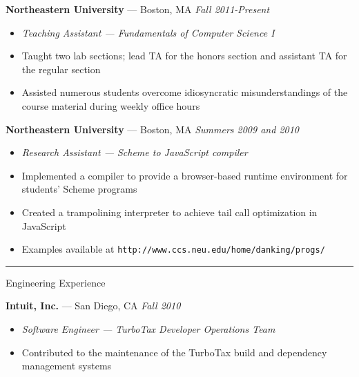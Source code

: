 \documentclass[10pt]{letter}
\begin{document}
\begin{tabbing}
{\large \bf Northeastern University} --- Boston, MA \` \textit{Fall 2011-Present}

\end{tabbing}
\begin{itemize}
\setlength\itemsep{1pt}
\item [] \textit{Teaching Assistant --- Fundamentals of Computer Science I}
\item{Taught two lab sections; lead TA for the honors section and assistant TA
  for the regular section}
\item{Assisted numerous students overcome idiosyncratic misunderstandings of the
  course material during weekly office hours}

\end{itemize}

\begin{tabbing}
{\large \bf Northeastern University} --- Boston, MA \` \textit{Summers 2009 and
  2010}

\end{tabbing}
\begin{itemize}
\setlength\itemsep{1pt}
\item [] \textit{Research Assistant --- Scheme to JavaScript compiler}
\item{Implemented a compiler to provide a browser-based runtime environment for
  students' Scheme programs}
\item{Created a trampolining interpreter to achieve tail call optimization in
  JavaScript}
\item{Examples available at \texttt{http://www.ccs.neu.edu/home/danking/progs/}}

\end{itemize}

\rule{\linewidth}{.5pt}

{\Large Engineering Experience}

\begin{tabbing}
{\large \bf Intuit, Inc.} --- San Diego, CA \` \textit{Fall 2010}

\end{tabbing}

\begin{itemize}
\setlength\itemsep{1pt}
\item [] {\textit{Software Engineer --- TurboTax Developer Operations Team}}
\item{Contributed to the maintenance of the TurboTax build and dependency
  management systems}
\end{itemize}
\end{document}
